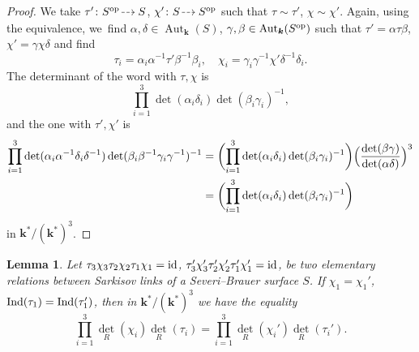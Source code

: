 \documentclass[JEP,XML,SOM,Unicode,NoFloatCountersInSection, NoEqCountersInSection,published]{cedram}
\newcommand{\dradpl}{{\hspace*{-2mm}\begin{tikzcd}[ampersand replacement=\&,column sep = scriptsize]\mbox{}\ar[r,dashed]\&\mbox{}\end{tikzcd}\hspace*{-2mm}}}
\newcommand{\dratst}{{\hspace*{-2.5mm}\begin{tikzcd}[ampersand replacement=\&,column sep = small]\mbox{}\ar[r,dashed]\&\mbox{}\end{tikzcd}\hspace*{-2mm}}}
\let\drascst\dratst
\newcommand{\dra}{\mathchoice{\dradpl}{\dratst}{\drascst}{\drascst}}
\newcommand{\id}{\textup{id}}
\newcommand{\Ind}{\textup{Ind}}
\newcommand{\op}{\textup{op}}
\newtheorem{lemma}[theorem]{Lemma}
\theoremstyle{definition}
\newcommand{\kk}{{\boldsymbol{k}}}
\DeclareMathOperator{\Aut}{Aut}
\begin{document}
\begin{proof}
We take $ \tau' \colon S^{\op} \dra S$, $\chi' \colon S \dra S^{\op}$ such that $\tau \sim \tau'$, $\chi \sim \chi'$. Again, using the equivalence, we~find $\alpha, \delta \in \Aut_{\kk}(S)$, $\gamma, \beta \in \Aut_{\kk}(S^{\op})$ such that $\tau' = \alpha \tau \beta$, $\chi' = \gamma \chi \delta$ and find
\[
\tau_i = \alpha_i \alpha^{-1} \tau' \beta^{-1}\beta_i, \quad \chi_i = \gamma_i \gamma^{-1}\chi' \delta^{-1}\delta_i.
\]
The determinant of the word with $\tau, \chi$ is
\[
\prod_{i=1}^3 \det(\alpha_i\delta_i)\det(\beta_i\gamma_i)^{-1},
\]
and the one with $\tau', \chi'$ is
\begin{align*}
\prod_{i=1}^3 \det(\alpha_i \alpha^{-1}\delta_i\delta^{-1})\det(\beta_i\beta^{-1}\gamma_i\gamma^{-1})^{-1} &= \biggl(\prod_{i=1}^3 \det(\alpha_i\delta_i)\det(\beta_i\gamma_i)^{-1}\biggr) \Bigl(\frac{\det(\beta\gamma)}{\det(\alpha\delta)}\Bigr)^3
\\
&= \biggl(\prod_{i=1}^3 \det(\alpha_i\delta_i)\det(\beta_i\gamma_i)^{-1}\biggr)
\end{align*}
in $\kk^*/(\kk^*)^3$.
\end{proof}

\begin{lemma} \label{DepPoint}
Let
$\tau_3\chi_3\tau_2\chi_2\tau_1\chi_1 = \id$,
$\tau_3'\chi_3'\tau_2'\chi_2'\tau_1'\chi_1' = \id$,
be two elementary relations between Sarkisov links of a Severi--Brauer surface $S$. If $\chi_1 = \chi_1'$, $\Ind(\tau_1) = \Ind(\tau_1')$, then in $\kk^* /(\kk^*)^3$ we have the equality
\[
\prod_{i = 1}^3 \det_R(\chi_i) \det_R(\tau_i) = \prod_{i = 1}^3 \det_R(\chi_i') \det_R(\tau_i').
\]
\end{lemma}
\end{document}
